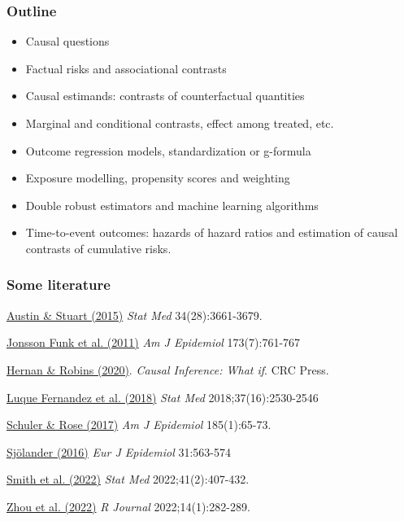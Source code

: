 \documentclass[12pt,dvipsnames,t,aspectratio=169, handout%
]{beamer}
\begin{document}
\begin{frame}
\frametitle{Outline}

\begin{itemize}

\item Causal questions
\medskip
\item Factual risks and associational contrasts 
\medskip
\item Causal estimands: contrasts of counterfactual quantities
\medskip
\item Marginal and conditional contrasts, effect among treated, etc.
\medskip
\item Outcome regression models, standardization or g-formula
\medskip
\item Exposure modelling, propensity scores and weighting 
\medskip
\item Double robust estimators and machine learning algorithms
\medskip
\item Time-to-event outcomes: hazards of hazard ratios and estimation
of causal contrasts of cumulative risks. 

\end{itemize}

\end{frame}

\begin{frame}
\frametitle{\large Some literature}
\bi
\item \href{https://doi.org/10.1002/sim.6607}{\color{blue}Austin \& Stuart (2015)} {\it Stat Med} 34(28):3661-3679.
\medskip 
\item
\href{https://doi.org/10.1093/aje/kwq439}{\color{blue} Jonsson Funk et al. (2011)} {\it Am J Epidemiol}  173(7):761-767
\medskip
\item
\href{https://www.hsph.harvard.edu/miguel-hernan/causal-inference-book/}
{\color{blue}Hernan \& Robins (2020)}. \textit{Causal Inference: What if}.
CRC Press.
\medskip
\item
\href{https://doi.org/10.1002/sim.7628}{\color{blue}Luque Fernandez et al. (2018)}
{\it Stat Med} 2018;37(16):2530-2546
\medskip
\item
\href{https://doi.org/10.1093/aje/kww165}{\color{blue}Schuler \& Rose (2017)} \textit{Am J Epidemiol} 185(1):65-73.
\medskip
\item 
 \href{https://doi.org/10.1007/s10654-016-0157-3}{\color{blue}Sj{\"o}lander (2016)} {\it Eur J Epidemiol} 31:563-574
\medskip
\item
\href{https://doi.org/10.1002/sim.9234}{\color{blue}Smith et al. (2022)} {\it Stat Med} 2022;41(2):407-432.
\medskip
\item
\href{https://journal.r-project.org/articles/RJ-2022-011/RJ-2022-011.pdf}{\color{blue}Zhou et al. (2022)} {\it R Journal} 2022;14(1):282-289.

\ei

\end{frame}
\end{document}
